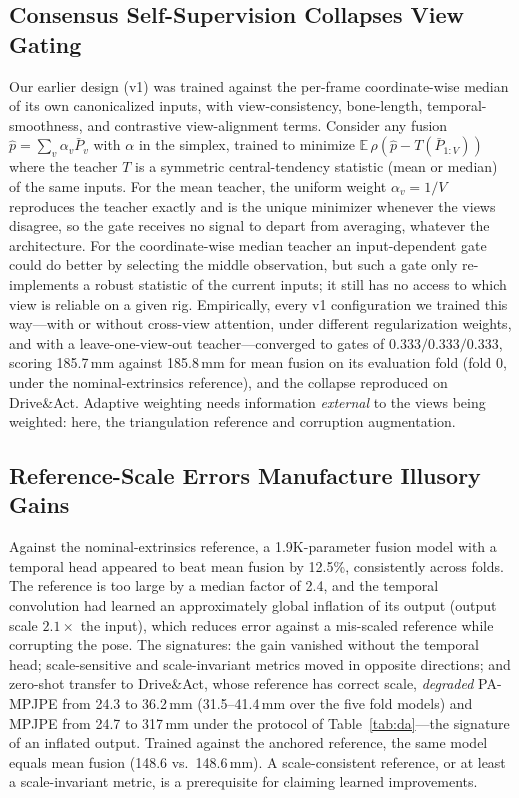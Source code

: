 \documentclass[journal]{IEEEtran}
\newcommand{\da}{Drive\&Act}
\begin{document}
\subsection{Consensus Self-Supervision Collapses View Gating}
\label{sec:collapse}
Our earlier design (v1) was trained against the per-frame coordinate-wise median of its own canonicalized inputs, with view-consistency, bone-length, temporal-smoothness, and contrastive view-alignment terms. Consider any fusion $\hat{p} = \sum_v \alpha_v \bar{P}_v$ with $\alpha$ in the simplex, trained to minimize $\mathbb{E}\,\rho(\hat{p} - T(\bar{P}_{1:V}))$ where the teacher $T$ is a symmetric central-tendency statistic (mean or median) of the same inputs. For the mean teacher, the uniform weight $\alpha_v = 1/V$ reproduces the teacher exactly and is the unique minimizer whenever the views disagree, so the gate receives no signal to depart from averaging, whatever the architecture. For the coordinate-wise median teacher an input-dependent gate could do better by selecting the middle observation, but such a gate only re-implements a robust statistic of the current inputs; it still has no access to which view is reliable on a given rig. Empirically, every v1 configuration we trained this way---with or without cross-view attention, under different regularization weights, and with a leave-one-view-out teacher---converged to gates of $0.333/0.333/0.333$, scoring 185.7\,mm against 185.8\,mm for mean fusion on its evaluation fold (fold 0, under the nominal-extrinsics reference), and the collapse reproduced on \da{}. Adaptive weighting needs information \emph{external} to the views being weighted: here, the triangulation reference and corruption augmentation.

\subsection{Reference-Scale Errors Manufacture Illusory Gains}
\label{sec:scaleartifact}
Against the nominal-extrinsics reference, a 1.9K-parameter fusion model with a temporal head appeared to beat mean fusion by 12.5\%, consistently across folds. The reference is too large by a median factor of 2.4, and the temporal convolution had learned an approximately global inflation of its output (output scale $2.1\times$ the input), which reduces error against a mis-scaled reference while corrupting the pose. The signatures: the gain vanished without the temporal head; scale-sensitive and scale-invariant metrics moved in opposite directions; and zero-shot transfer to \da{}, whose reference has correct scale, \emph{degraded} PA-MPJPE from 24.3 to 36.2\,mm (31.5--41.4\,mm over the five fold models) and MPJPE from 24.7 to 317\,mm under the protocol of Table~\ref{tab:da}---the signature of an inflated output. Trained against the anchored reference, the same model equals mean fusion (148.6 vs.\ 148.6\,mm). A scale-consistent reference, or at least a scale-invariant metric, is a prerequisite for claiming learned improvements.
\end{document}
